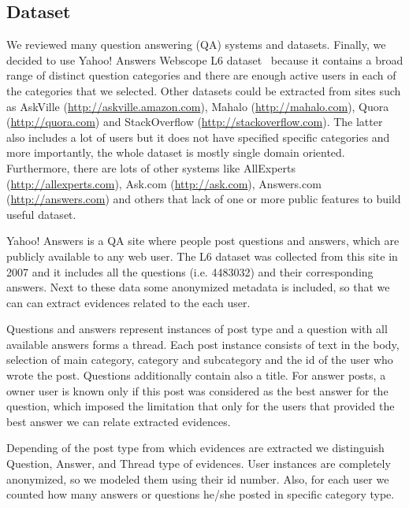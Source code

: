 \documentclass[conference]{IEEEtran}
\begin{document}
\subsection{Dataset}
\label{sec:dataset}
We reviewed many question answering (QA) systems and datasets. Finally, we decided to use Yahoo! Answers Webscope L6 dataset~\cite{bib:yahool6} because it contains a broad range of distinct question categories and there are enough active users in each of the categories that we selected. Other datasets could be extracted from sites such as AskVille (\url{http://askville.amazon.com}), Mahalo (\url{http://mahalo.com}), Quora (\url{http://quora.com}) and StackOverflow (\url{http://stackoverflow.com}). The latter also includes a lot of users but it does not have specified specific categories and more importantly, the whole dataset is mostly single domain oriented. Furthermore, there are lots of other systems like AllExperts (\url{http://allexperts.com}), Ask.com (\url{http://ask.com}), Answers.com (\url{http://answers.com}) and others that lack of one or more public features to build useful dataset.

Yahoo! Answers is a QA site where people post questions and answers, which are publicly available to any web user. The L6 dataset was collected from this site in 2007 and it includes all the questions (i.e. 4483032) and their corresponding answers. Next to these data some anonymized metadata is included, so that we can can extract evidences related to the each user.

Questions and answers represent instances of post type and a question with all available answers forms a thread. Each post instance consists of text in the body, selection of main category, category and subcategory and the id of the user who wrote the post. Questions additionally contain also a title. For answer posts, a owner user is known only if this post was considered as the best answer for the question, which imposed the limitation that only for the users that provided the best answer we can relate extracted evidences.

Depending of the post type from which evidences are extracted we distinguish Question, Answer, and Thread type of evidences. User instances are completely anonymized, so we modeled them using their id number. Also, for each user we counted how many answers or questions he/she posted in specific category type.
\end{document}
